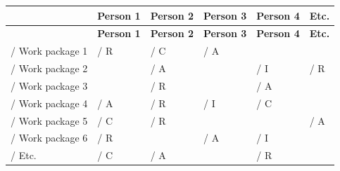 \documentclass[10pt,letterpaper]{article}
\renewcommand\arraystretch{1.25}
\begin{document}
\begin{center}
\begingroup
\setlength\tabcolsep{2.0pt}
\scriptsize
\renewcommand\arraystretch{1.55}
\begin{longtable}{|>{\raggedright\arraybackslash}p{0.995in}|>{\raggedright\arraybackslash}p{0.995in}|>{\raggedright\arraybackslash}p{0.995in}|>{\raggedright\arraybackslash}p{0.995in}|>{\raggedright\arraybackslash}p{0.995in}|>{\raggedright\arraybackslash}p{0.995in}|}
\hline
\rowcolor{light}
\rule{0pt}{11pt}\hspace{0pt} & \textbf{Person 1} & \textbf{Person 2} & \textbf{Person 3} & \textbf{Person 4} & \textbf{Etc.} \\ \hline
\endfirsthead
\hline\rowcolor{light} \rule{0pt}{11pt}\hspace{0pt} & \textbf{Person 1} & \textbf{Person 2} & \textbf{Person 3} & \textbf{Person 4} & \textbf{Etc.} \\ \hline
\endhead
/ Work package 1 & / R & / C & / A & \rule{0pt}{11pt}\hspace{0pt} & \rule{0pt}{11pt}\hspace{0pt} \\ \hline
/ Work package 2 & \rule{0pt}{11pt}\hspace{0pt} & / A & \rule{0pt}{11pt}\hspace{0pt} & / I & / R \\ \hline
/ Work package 3 & \rule{0pt}{11pt}\hspace{0pt} & / R & \rule{0pt}{11pt}\hspace{0pt} & / A & \rule{0pt}{11pt}\hspace{0pt} \\ \hline
/ Work package 4 & / A & / R & / I & / C & \rule{0pt}{11pt}\hspace{0pt} \\ \hline
/ Work package 5 & / C & / R & \rule{0pt}{11pt}\hspace{0pt} & \rule{0pt}{11pt}\hspace{0pt} & / A \\ \hline
/ Work package 6 & / R & \rule{0pt}{11pt}\hspace{0pt} & / A & / I & \rule{0pt}{11pt}\hspace{0pt} \\ \hline
/ Etc. & / C & / A & \rule{0pt}{11pt}\hspace{0pt} & / R & \rule{0pt}{11pt}\hspace{0pt} \\ \hline
\end{longtable}
\endgroup
\end{center}
\end{document}
